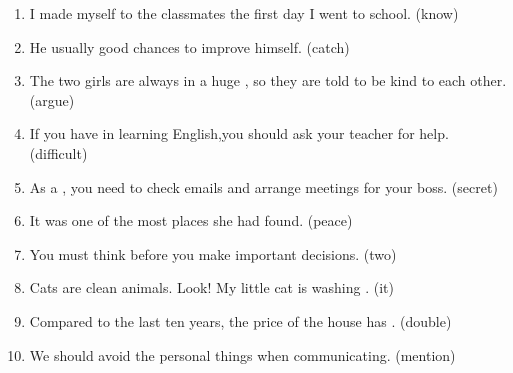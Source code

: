 \documentclass{ExamJHSEngl}
\begin{document}
\begin{enumerate}[start=\value{orders}+1,label={\arabic*.},leftmargin=2em,itemsep=0.75ex]
  \item I made myself  to the classmates the first day I went to school. (know)
  \item He usually  good chances to improve himself. (catch)
  \item The two girls are always in a huge , so they are told to be kind to each other. (argue)
  \item If you have  in learning English,you should ask your teacher for help. (difficult)
  \item As a , you need to check emails and arrange meetings for your boss. (secret)
  \item It was one of the most  places she had found. (peace)
  \item You must think  before you make important decisions. (two)
  \item Cats are clean animals. Look! My little cat is washing . (it)
  \item Compared to the last ten years, the price of the house has . (double)
  \item We should avoid  the personal things when communicating. (mention)
\end{enumerate}


\subsubsection{}
\end{document}
